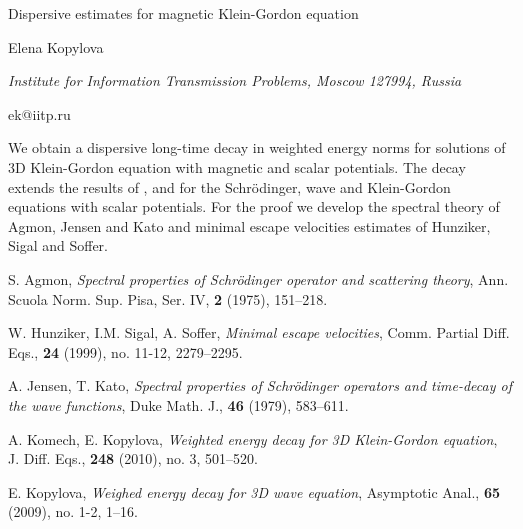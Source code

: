 \documentclass[10pt,a4paper]{article}
\begin{document}
\begin{center}

{\Large Dispersive estimates for magnetic Klein-Gordon equation}

\bigskip



{\sc Elena Kopylova}

{\small\it Institute for Information Transmission Problems, Moscow 127994, Russia}

{\small\rm ek@iitp.ru}

\end{center}

\bigskip


We obtain a dispersive long-time decay in weighted
energy norms for solutions of  3D Klein-Gordon equation
with magnetic and scalar potentials.
The decay extends the results of \cite{kopylovaJK}, 
\cite{kopylovaK} and \cite{kopylovaKK} for the  Schr\"odinger, wave 
and Klein-Gordon equations  with  scalar potentials.
For the proof we develop the spectral
theory of Agmon, Jensen and Kato and minimal escape velocities 
estimates of  Hunziker, Sigal and Soffer.

\begin{thebibliography}{}

S. Agmon, \emph{Spectral properties of Schr\"odinger operator 
and scattering theory},
Ann. Scuola Norm. Sup. Pisa, Ser. IV, \textbf{2} (1975), 151--218.

W. Hunziker, I.M. Sigal, A. Soffer,
\emph{Minimal escape velocities},
Comm. Partial Diff. Eqs., \textbf{24} (1999), no. 11-12, 2279--2295.

A. Jensen, T. Kato,
\emph{Spectral properties of Schr\"odinger operators and time-decay
of the wave functions}, 
Duke Math. J., \textbf{46} (1979), 583--611.

A. Komech, E. Kopylova, 
\emph{Weighted energy decay for 3D Klein-Gordon equation},
J. Diff. Eqs., \textbf{248} (2010), no. 3, 501--520.

E. Kopylova,
\emph{Weighed energy decay for 3D wave equation}, 
Asymptotic Anal., \textbf{65} (2009), no. 1-2, 1--16.

\end{thebibliography}
\end{document}
